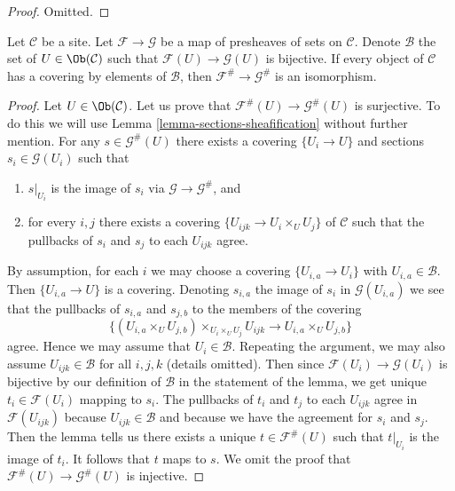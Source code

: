 \begin{proof}
Omitted.
\end{proof}

\begin{lemma}
\label{lemma-isomorphism-sheafifications}
Let $\mathcal{C}$ be a site. Let $\mathcal{F} \to \mathcal{G}$ be a map
of presheaves of sets on $\mathcal{C}$. Denote $\mathcal{B}$ the set of
$U \in \Ob(\mathcal{C})$ such that $\mathcal{F}(U) \to \mathcal{G}(U)$
is bijective. If every object of $\mathcal{C}$ has a covering by elements
of $\mathcal{B}$, then $\mathcal{F}^\# \to \mathcal{G}^\#$ is an isomorphism.
\end{lemma}

\begin{proof}
Let $U \in \Ob(\mathcal{C})$.
Let us prove that $\mathcal{F}^\#(U) \to \mathcal{G}^\#(U)$ is
surjective. To do this we will use Lemma \ref{lemma-sections-sheafification}
without further mention. For any $s \in \mathcal{G}^\#(U)$ there exists
a covering $\{U_i \to U\}$ and sections $s_i \in \mathcal{G}(U_i)$ such that
\begin{enumerate}
\item $s|_{U_i}$ is the image of $s_i$ via $\mathcal{G} \to \mathcal{G}^\#$,
and
\item for every $i, j$ there exists a covering
$\{U_{ijk} \to U_i \times_U U_j\}$ of $\mathcal{C}$ such that
the pullbacks of $s_i$ and $s_j$ to each $U_{ijk}$ agree.
\end{enumerate}
By assumption, for each $i$ we may choose a covering $\{U_{i, a} \to U_i\}$
with $U_{i, a} \in \mathcal{B}$. Then $\{U_{i, a} \to U\}$ is a covering.
Denoting $s_{i, a}$ the image of $s_i$ in $\mathcal{G}(U_{i, a})$
we see that the pullbacks of $s_{i, a}$ and $s_{j, b}$ to the members
of the covering
$$
\{(U_{i, a} \times_U U_{j, b}) \times_{U_i \times_U U_j} U_{ijk}
\to U_{i, a} \times_U U_{j, b}\}
$$
agree. Hence we may assume that $U_i \in \mathcal{B}$. Repeating
the argument, we may also assume $U_{ijk} \in \mathcal{B}$ for
all $i, j, k$ (details omitted).
Then since $\mathcal{F}(U_i) \to \mathcal{G}(U_i)$
is bijective by our definition of $\mathcal{B}$ in the statement
of the lemma, we get unique $t_i \in \mathcal{F}(U_i)$
mapping to $s_i$. The pullbacks of $t_i$ and $t_j$
to each $U_{ijk}$ agree in $\mathcal{F}(U_{ijk})$ because
$U_{ijk} \in \mathcal{B}$ and because we have the agreement
for $s_i$ and $s_j$.
Then the lemma tells us there exists a unique
$t \in \mathcal{F}^\#(U)$ such that $t|_{U_i}$ is the image of $t_i$.
It follows that $t$ maps to $s$.
We omit the proof that $\mathcal{F}^\#(U) \to \mathcal{G}^\#(U)$
is injective.
\end{proof}








